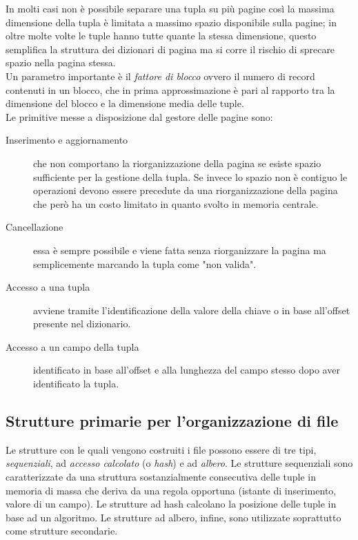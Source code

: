 In  molti casi non è possibile separare una tupla su più pagine così la massima dimensione della tupla è limitata a massimo spazio disponibile sulla pagine; in oltre molte volte le tuple hanno tutte quante la stessa dimensione, questo semplifica la struttura dei dizionari di pagina ma si corre il rischio di sprecare spazio nella pagina stessa.\\
Un parametro importante è il \emph{fattore di blocco} ovvero il numero di record contenuti in un blocco, che in prima approssimazione è pari al rapporto tra la dimensione del blocco e la dimensione media delle tuple.\\
Le primitive messe a disposizione dal gestore delle pagine sono:
\begin{description}
  \item[Inserimento e aggiornamento] che non comportano la riorganizzazione della pagina se esiste spazio sufficiente per la gestione della tupla. Se invece lo spazio non è contiguo le operazioni devono essere precedute da una riorganizzazione della pagina che però ha un costo limitato in quanto svolto in memoria centrale.
  \item[Cancellazione] essa è sempre possibile e viene fatta senza riorganizzare la pagina ma semplicemente marcando la tupla come "non valida".
  \item[Accesso a una tupla]  avviene tramite l'identificazione della valore della chiave o in base all'offset presente nel dizionario.
  \item[Accesso a un campo della tupla] identificato in base all'offset e alla lunghezza del campo stesso dopo aver identificato la tupla.
\end{description}
\subsection{Strutture primarie per l'organizzazione di file}
Le strutture con le quali vengono costruiti i file possono essere di tre tipi, \emph{sequenziali}, ad \emph{accesso calcolato} (o \emph{hash}) e ad \emph{albero}. Le strutture sequenziali sono caratterizzate da una struttura sostanzialmente consecutiva delle tuple in memoria di massa che deriva da una regola opportuna (istante di inserimento, valore di un campo).
Le strutture ad hash calcolano la posizione delle tuple in base ad un algoritmo. Le strutture ad albero, infine, sono utilizzate soprattutto come strutture secondarie.\\
